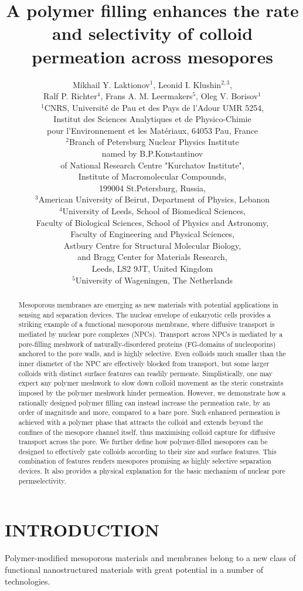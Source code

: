 \documentclass[12pt, a4paper]{article}
\title{A polymer filling enhances the rate and selectivity of colloid permeation across mesopores}
\author{Mikhail Y. Laktionov$^1$, Leonid I. Klushin$^{2,3}$,\\
Ralf P. Richter$^4$, Frans A. M. Leermakers$^5$, Oleg V. Borisov$^1$\\
$^{1}$CNRS, Universit\'e de Pau et des Pays de l'Adour UMR 5254,\\
Institut des Sciences Analytiques et de Physico-Chimie\\
pour l'Environnement et les Mat\'eriaux, 64053 Pau, France\\
$^{2}$Branch of Petersburg Nuclear Physics Institute\\
named by B.P.Konstantinov\\
of National Research Centre "Kurchatov Institute",\\
Institute of Macromolecular Compounds,\\
199004 St.Petersburg, Russia,\\
$^{3}$American University of Beirut, Department of Physics, Lebanon\\
$^{4}$University of Leeds, School of Biomedical Sciences,\\
Faculty of Biological Sciences, 
School of Physics and Astronomy,\\
Faculty of Engineering and Physical Sciences,\\  
Astbury Centre for Structural Molecular Biology,\\ 
and Bragg Center for Materials Research,\\ 
Leeds, LS2 9JT, United Kingdom\\
$^{5}$University of Wageningen, The Netherlands\\
}
\date{}
\begin{document}
\maketitle

\begin{abstract}

Mesoporous membranes are emerging as new materials with potential applications in sensing and separation devices.
The nuclear envelope of eukaryotic cells provides a striking example of a functional mesoporous membrane, where diffusive transport is mediated by nuclear pore complexes (NPCs).
Transport across NPCs is mediated by a pore-filling meshwork of naturally-disordered proteins (FG-domains of nucleoporins) anchored to the pore walls, and is highly selective.
Even colloids much smaller than the inner diameter of the NPC are effectively blocked from transport, but some larger colloids with distinct surface features can readily permeate.
Simplistically, one may expect any polymer meshwork to slow down colloid movement as the steric constraints imposed by the polymer meshwork hinder permeation.
However, we demonstrate how a rationally designed polymer filling can instead increase the permeation rate, by an order of magnitude and more, compared to a bare pore.
Such enhanced permeation is achieved with a polymer phase that attracts the colloid and extends beyond the confines of the mesopore channel itself, thus maximising colloid capture for diffusive transport across the pore.
We further define how polymer-filled mesopores can be designed to effectively gate colloids according to their size and surface features. 
This combination of features renders mesopores promising as highly selective separation devices.
It also provides a physical explanation for the basic mechanism of nuclear pore permselectivity.
\end{abstract}


\section{INTRODUCTION}

Polymer-modified mesoporous materials and membranes belong to a new class of functional nanostructured materials with great potential in a number of technologies. 
\end{document}
